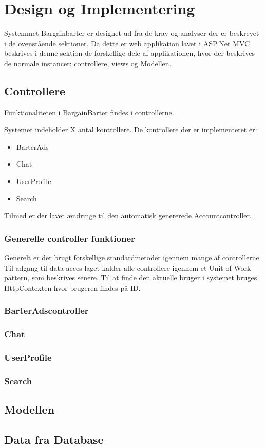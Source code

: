 \chapter{Design og Implementering}
Systemmet Bargainbarter er designet ud fra de krav og analyser der er beskrevet i de ovenstående sektioner. Da dette er web applikation lavet i ASP.Net MVC beskrives i denne sektion de forskellige dele af applikationen, hvor der beskrives de normale instancer: controllere, views og Modellen. 






\section{Controllere}
Funktionaliteten i BargainBarter findes i controllerne. 

Systemet indeholder X antal kontrollere. De kontrollere der er implementeret er: 
\begin{itemize}
	\item BarterAds
	\item Chat
	\item UserProfile
	\item Search 
\end{itemize}

\noindent Tilmed er der lavet ændringe til den automatisk genererede Accountcontroller. 

%
\subsection{Generelle controller funktioner}

Generelt er der brugt forskellige standardmetoder igennem mange af controllerne. Til adgang til data acces laget kalder alle controllere igennem et Unit of Work pattern, som beskrives senere. Til at finde den aktuelle bruger i systemet bruges HttpContexten hvor brugeren findes på ID.  


%


\subsection{BarterAdscontroller}
\subsection{Chat}
\subsection{UserProfile}
\subsection{Search}


\section{Modellen}

\section{Data fra Database}

